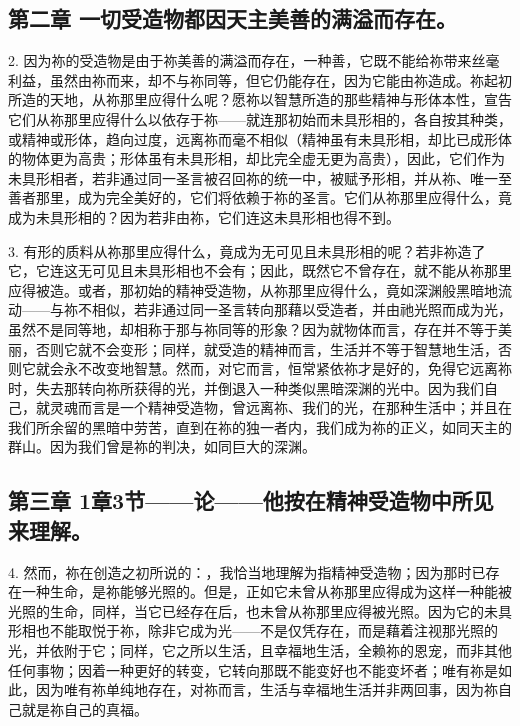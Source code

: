 
\subsection{第二章 一切受造物都因天主美善的满溢而存在。}

2. 因为祢的受造物是由于祢美善的满溢而存在，一种善，它既不能给祢带来丝毫利益，虽然由祢而来，却不与祢同等，但它仍能存在，因为它能由祢造成。祢起初所造的天地，从祢那里应得什么呢？愿祢以智慧所造的那些精神与形体本性，宣告它们从祢那里应得什么以依存于祢——就连那初始而未具形相的，各自按其种类，或精神或形体，趋向过度，远离祢而毫不相似（精神虽有未具形相，却比已成形体的物体更为高贵；形体虽有未具形相，却比完全虚无更为高贵），因此，它们作为未具形相者，若非通过同一圣言被召回祢的统一中，被赋予形相，并从祢、唯一至善者那里，成为完全美好的，它们将依赖于祢的圣言。它们从祢那里应得什么，竟成为未具形相的？因为若非由祢，它们连这未具形相也得不到。\par

3. 有形的质料从祢那里应得什么，竟成为无可见且未具形相的呢？若非祢造了它，它连这无可见且未具形相也不会有；因此，既然它不曾存在，就不能从祢那里应得被造。或者，那初始的精神受造物，从祢那里应得什么，竟如深渊般黑暗地流动——与祢不相似，若非通过同一圣言转向那藉以受造者，并由祂光照而成为光，虽然不是同等地，却相称于那与祢同等的形象？因为就物体而言，存在并不等于美丽，否则它就不会变形；同样，就受造的精神而言，生活并不等于智慧地生活，否则它就会永不改变地智慧。然而，对它而言，恒常紧依祢才是好的，免得它远离祢时，失去那转向祢所获得的光，并倒退入一种类似黑暗深渊的光中。因为我们自己，就灵魂而言是一个精神受造物，曾远离祢、我们的光，在那种生活中；并且在我们所余留的黑暗中劳苦，直到在祢的独一者内，我们成为祢的正义，如同天主的群山。因为我们曾是祢的判决，如同巨大的深渊。\par


\subsection{第三章  1章3节——论——他按在精神受造物中所见来理解。}

4. 然而，祢在创造之初所说的：，我恰当地理解为指精神受造物；因为那时已存在一种生命，是祢能够光照的。但是，正如它未曾从祢那里应得成为这样一种能被光照的生命，同样，当它已经存在后，也未曾从祢那里应得被光照。因为它的未具形相也不能取悦于祢，除非它成为光——不是仅凭存在，而是藉着注视那光照的光，并依附于它；同样，它之所以生活，且幸福地生活，全赖祢的恩宠，而非其他任何事物；因着一种更好的转变，它转向那既不能变好也不能变坏者；唯有祢是如此，因为唯有祢单纯地存在，对祢而言，生活与幸福地生活并非两回事，因为祢自己就是祢自己的真福。\par

